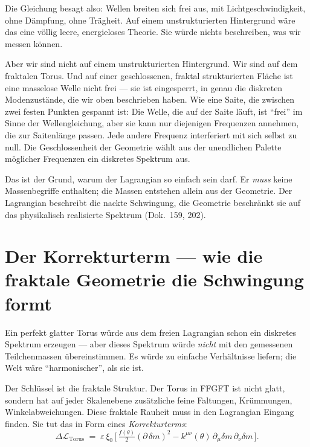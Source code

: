 \medskip\noindent
Die Gleichung besagt also: Wellen breiten sich frei aus, mit
Lichtgeschwindigkeit, ohne Dämpfung, ohne Trägheit. Auf einem unstrukturierten Hintergrund wäre
das eine völlig leere, energieloses Theorie. Sie würde nichts
beschreiben, was wir messen können.

Aber wir sind nicht auf einem unstrukturierten Hintergrund. Wir sind
auf dem fraktalen Torus. Und auf einer geschlossenen,
fraktal strukturierten Fläche ist eine masselose Welle nicht frei ---
sie ist eingesperrt, in genau die diskreten Modenzustände, die wir
oben beschrieben haben. Wie eine Saite, die zwischen zwei festen
Punkten gespannt ist: Die Welle, die auf der Saite läuft, ist
\enquote{frei} im Sinne der Wellengleichung, aber sie kann nur
diejenigen Frequenzen annehmen, die zur Saitenlänge passen. Jede
andere Frequenz interferiert mit sich selbst zu null. Die
Geschlossenheit der Geometrie wählt aus der unendlichen Palette
möglicher Frequenzen ein diskretes Spektrum aus.

Das ist der Grund, warum der Lagrangian so einfach sein darf. Er
\emph{muss} keine Massenbegriffe enthalten; die Massen entstehen
allein aus der Geometrie. Der Lagrangian beschreibt die nackte
Schwingung, die Geometrie beschränkt sie auf das physikalisch
realisierte Spektrum (Dok.~159, 202).

\section{Der Korrekturterm --- wie die fraktale Geometrie die Schwingung formt}

Ein perfekt glatter Torus würde aus dem freien Lagrangian schon ein
diskretes Spektrum erzeugen --- aber dieses Spektrum würde
\emph{nicht} mit den gemessenen Teilchenmassen übereinstimmen. Es
würde zu einfache Verhältnisse liefern; die Welt wäre
\enquote{harmonischer}, als sie ist.

Der Schlüssel ist die fraktale Struktur. Der Torus in FFGFT ist
nicht glatt, sondern hat auf jeder Skalenebene zusätzliche feine
Faltungen, Krümmungen, Winkelabweichungen. Diese fraktale Rauheit
muss in den Lagrangian Eingang finden. Sie tut das in Form eines
\emph{Korrekturterms}:
\[
  \Delta\mathcal{L}_{\text{Torus}}
  \;=\; \varepsilon\,\xi_0\,
        \bigl[\, \tfrac{f(\theta)}{2}(\partial\,\delta m)^2
              - k^{\mu\nu}(\theta)\,\partial_\mu\delta m\,\partial_\nu\delta m \,\bigr].
\]

